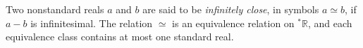 Two nonstandard reals $a$ and $b$ are said to be \emph{infinitely close}, in symbols $a \simeq b$, if $a - b$ is infinitesimal. The relation $\simeq$ is an equivalence relation on $^*\mathbb{R}$, and each equivalence class contains at most one standard real.
